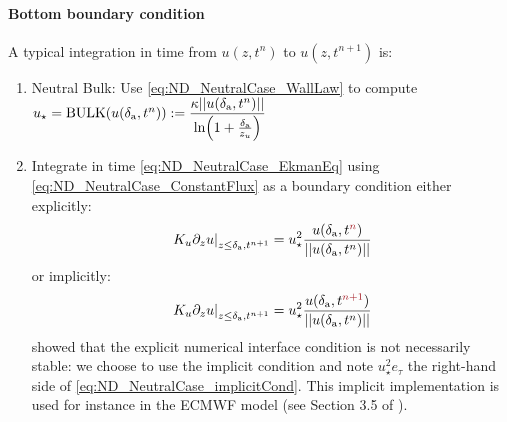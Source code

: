 \paragraph{Bottom boundary condition}
A typical integration in time from $u(z, t^{n})$ to
$u(z, t^{n+1})$ is:
\begin{enumerate}
	\item Neutral Bulk: Use \eqref{eq:ND_NeutralCase_WallLaw}
		to compute $u_\star = {\rm BULK}(u(\delta_{\rm a}, t^n))
		:= \displaystyle \frac{\kappa ||u(\delta_{\rm a}, t^n)||}
			{\ln(1+\frac{\delta_{\rm a}}{z_{u}})}$
  \item Integrate in time \eqref{eq:ND_NeutralCase_EkmanEq}
  using \eqref{eq:ND_NeutralCase_ConstantFlux} as a boundary condition
		either explicitly: 
	\begin{equation}
		\left.K_u \partial_z u
		\right|_{z\leq \delta_{\rm a}, t^{n+1}}
		= u_\star^2 \frac{u(\delta_{\rm a},
		t^{\emphase{n}})}
		{||u(\delta_{\rm a}, t^n)||}
	\end{equation}
		or implicitly:
	\begin{equation}
		\label{eq:ND_NeutralCase_implicitCond}
		\left.K_u \partial_z u
		\right|_{z\leq \delta_{\rm a}, t^{n+1}}
		= u_\star^2 \frac{u(\delta_{\rm a},
		t^{\emphase{n+1}})}
		{||u(\delta_{\rm a}, t^n)||}
	\end{equation}
	\cite{lemarie_stability_2015} showed that the explicit
	numerical interface condition is not necessarily
	stable: we choose to use the implicit condition and note
		$u_\star^2 e_\tau$ the right-hand side of
		\eqref{eq:ND_NeutralCase_implicitCond}.
	This implicit implementation is used for instance in the
	ECMWF model (see Section 3.5 of \citep{ecmwf_ifs_2020}).
\end{enumerate}
